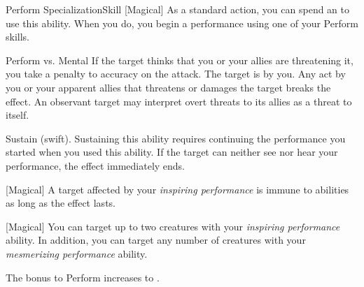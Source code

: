 \begin{feat}{Perform Specialization}{Skill}
        [Magical] As a standard action, you can spend an  to use this ability.
        When you do, you begin a performance using one of your Perform skills.
        \begin{ability}
            \begin{spelltargetinginfo}
            \end{spelltargetinginfo}
            \begin{spelleffects}
                \begin{spellattack}{Perform vs. Mental}
                    \spellspecial If the target thinks that you or your allies are threatening it, you take a  penalty to accuracy on the attack.
                    \spellsuccess The target is \fascinated by you.
                    Any act by you or your apparent allies that threatens or damages the target breaks the effect.
                    An observant target may interpret overt threats to its allies as a threat to itself.
                \end{spellattack}
                \spelldur Sustain (swift). Sustaining this ability requires continuing the performance you started when you used this ability. If the target can neither see nor hear your performance, the effect immediately ends.
            \end{spelleffects}
        \end{ability}

        [Magical] A target affected by your \textit{inspiring performance} is immune to  abilities as long as the effect lasts.

        [Magical] You can target up to two creatures with your \textit{inspiring performance} ability.
        In addition, you can target any number of creatures with your \textit{mesmerizing performance} ability.

         The bonus to Perform increases to .


\end{feat}
